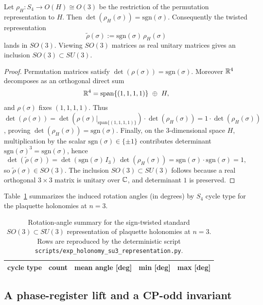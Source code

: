 \begin{lemma}\label{lem:s4_so3_twist}
Let $\rho_H:S_4\to O(H)\cong O(3)$ be the restriction of the permutation representation to $H$.
Then $\det(\rho_H(\sigma))=\mathrm{sgn}(\sigma)$.
Consequently the twisted representation
\[
\widetilde\rho(\sigma):=\mathrm{sgn}(\sigma)\,\rho_H(\sigma)
\]
lands in $SO(3)$.
Viewing $SO(3)$ matrices as real unitary matrices gives an inclusion $SO(3)\subset SU(3)$.
\end{lemma}
\begin{proof}
Permutation matrices satisfy $\det(\rho(\sigma))=\mathrm{sgn}(\sigma)$.
Moreover $\mathbb{R}^4$ decomposes as an orthogonal direct sum
\[
\RR^4=\mathrm{span}\{(1,1,1,1)\}\ \oplus\ H,
\]
and $\rho(\sigma)$ fixes $(1,1,1,1)$.
Thus $\det(\rho(\sigma))=\det(\rho(\sigma)|_{\mathrm{span}\{(1,1,1,1)\}})\cdot \det(\rho_H(\sigma))=1\cdot \det(\rho_H(\sigma))$, proving $\det(\rho_H(\sigma))=\mathrm{sgn}(\sigma)$.
Finally, on the $3$-dimensional space $H$, multiplication by the scalar $\mathrm{sgn}(\sigma)\in\{\pm 1\}$ contributes determinant $\mathrm{sgn}(\sigma)^3=\mathrm{sgn}(\sigma)$, hence
\[
\det(\widetilde\rho(\sigma))=\det(\mathrm{sgn}(\sigma)\,I_3)\,\det(\rho_H(\sigma))=\mathrm{sgn}(\sigma)\cdot \mathrm{sgn}(\sigma)=1,
\]
so $\widetilde\rho(\sigma)\in SO(3)$.
The inclusion $SO(3)\subset SU(3)$ follows because a real orthogonal $3\times 3$ matrix is unitary over $\mathbb{C}$, and determinant $1$ is preserved.
\end{proof}
Table~\ref{tab:holonomy_su3_rotation} summarizes the induced rotation angles (in degrees) by $S_4$ cycle type for the plaquette holonomies at $n=3$.

\begin{table}[t]
\centering
\small
\setlength{\tabcolsep}{10pt}
\renewcommand{\arraystretch}{1.15}
\begin{tabular}{lrrrr}
\toprule
cycle type & count & mean angle [deg] & min [deg] & max [deg] \\
\midrule
%
\end{tabular}
\caption{Rotation-angle summary for the sign-twisted standard $SO(3)\subset SU(3)$ representation of plaquette holonomies at $n=3$. Rows are reproduced by the deterministic script \texttt{scripts/exp\_holonomy\_su3\_representation.py}.}
\label{tab:holonomy_su3_rotation}
\end{table}

\subsection{A phase-register lift and a CP-odd invariant}
\label{subsec:holonomy_phase_lift_cp}

